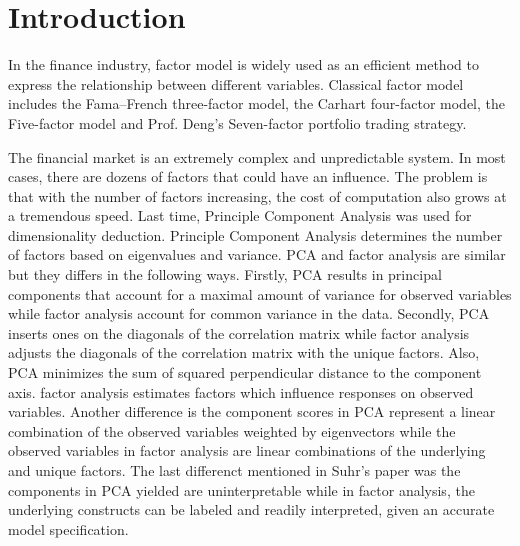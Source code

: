 \documentclass[10pt, conference]{IEEEtran}
\begin{document}


%
\IEEEpeerreviewmaketitle



\section{Introduction}
In the finance industry, factor model is widely used as an efficient method to express the relationship between different variables.  Classical factor model includes the Fama–French three-factor model\cite{ThreeFactor}, the Carhart four-factor model\cite{FourFactor}, the Five-factor model\cite{FiveFactor} and Prof. Deng's Seven-factor portfolio trading strategy\cite{SevenFactor}. 

The financial market is an extremely complex and unpredictable system. In most cases, there are dozens of factors that could have an influence. The problem is that with the number of factors increasing, the cost of computation also grows at a tremendous speed. Last time, Principle Component Analysis was used for dimensionality deduction. Principle Component Analysis determines the number of factors based on eigenvalues and variance. PCA and factor analysis are similar but they differs in the following ways\cite{Diff}. Firstly, PCA results in principal components that account for a maximal amount of variance for observed variables while factor analysis account for common variance in the data. Secondly, PCA inserts ones on the diagonals of the correlation matrix while factor analysis adjusts the diagonals of the correlation matrix with the unique factors. Also, PCA minimizes the sum of squared perpendicular distance to the component axis. factor analysis estimates factors which influence responses on observed variables. Another difference is the component scores in PCA represent a linear combination of the observed variables weighted by eigenvectors while the observed variables in factor analysis are linear combinations of the underlying and unique factors. The last differenct mentioned in Suhr's paper was the components in PCA yielded are uninterpretable while in factor analysis, the underlying constructs can be labeled and readily interpreted, given an accurate model specification. 
\end{document}
